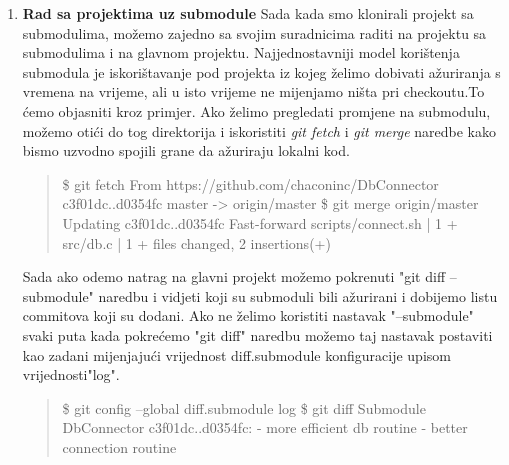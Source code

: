 \documentclass {article}
\begin{document}
\begin{enumerate}
\begin{enumerate}
\item {\textbf{Rad sa projektima uz submodule}}
Sada kada smo klonirali projekt sa submodulima, možemo zajedno sa svojim suradnicima raditi na projektu sa submodulima i na glavnom projektu.
\newline Najjednostavniji model korištenja submodula je iskorištavanje pod projekta iz kojeg želimo dobivati ažuriranja s vremena na vrijeme, ali u isto vrijeme ne mijenjamo ništa pri checkoutu.\newline To ćemo objasniti kroz primjer.
\newline Ako želimo pregledati promjene na submodulu, možemo otići do tog direktorija i iskoristiti \emph{git fetch} i \emph{git merge} naredbe kako bismo uzvodno spojili grane da ažuriraju lokalni kod.

    \begin{quote}
        \$ git fetch
\newline From https://github.com/chaconinc/DbConnector
   \newline c3f01dc..d0354fc  master     -> origin/master
\newline \$ git merge origin/master
\newline Updating c3f01dc..d0354fc
\newline Fast-forward
 \newline scripts/connect.sh | 1 +
 \newline src/db.c           | 1 +
  files changed, 2 insertions(+)
    \end{quote}
    
    \newpage
Sada ako odemo natrag na glavni projekt možemo pokrenuti "git diff --submodule" naredbu i vidjeti koji su submoduli bili ažurirani i dobijemo listu commitova koji su dodani. Ako ne želimo koristiti nastavak "--submodule" svaki puta kada pokrećemo "git diff" naredbu možemo taj nastavak postaviti kao zadani mijenjajući vrijednost diff.submodule konfiguracije upisom vrijednosti"log".

    \begin{quote}
        \$ git config --global diff.submodule log
\newline\$ git diff
\newline Submodule DbConnector c3f01dc..d0354fc:
\newline  - more efficient db routine
 \newline - better connection routine
    \end{quote}
    

\end{enumerate}
\end{enumerate}
\end{document}

